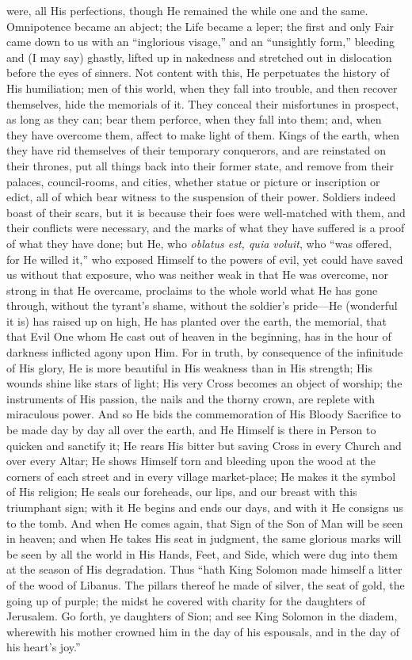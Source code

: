 were, all His perfections, though He remained the while one and the
same. Omnipotence became an abject; the Life became a leper; the first
and only Fair came down to us with an ``inglorious visage,''
and an ``unsightly form,'' bleeding and (I may say) ghastly,
lifted up in nakedness and stretched out in dislocation before the
eyes of sinners. Not content with this, He perpetuates the history of
His humiliation; men of this world, when they fall into trouble, and
then recover themselves, hide the memorials of it. They conceal their
misfortunes in prospect, as long as they can; bear them perforce, when
they fall into them; and, when they have overcome them, affect to make
light of them. Kings of the earth, when they have rid themselves of
their temporary conquerors, and are reinstated on their thrones, put
all things back into their former state, and remove from their
palaces, council-rooms, and cities, whether statue or picture or
inscription or edict, all of which bear witness to the suspension of
their power. Soldiers indeed boast of their scars, but it is because
their foes were well-matched with them, and their conflicts were
necessary, and the marks of what they have suffered is a proof of what
they have done; but He, who \emph{oblatus est, quia voluit}, who
``was offered, for He willed it,'' who exposed Himself to the
powers of evil, yet could have saved us without that exposure, who was
neither weak in that He was overcome, nor strong in that He overcame,
proclaims to the whole world what He has gone through, without the
tyrant's shame, without the soldier's pride—He (wonderful it is) has
raised up on high, He has planted over the earth, the memorial, that
that Evil One whom He cast out of heaven in the beginning, has in the
hour of darkness inflicted agony upon Him. For in truth, by
consequence of the infinitude of His glory, He is more beautiful in
His weakness than in His strength; His wounds shine like stars of
light; His very Cross becomes an object of worship; the instruments of
His passion, the nails and the thorny crown, are replete with
miraculous power. And so He bids the commemoration of His Bloody
Sacrifice to be made day by day all over the earth, and He Himself is
there in Person to quicken and sanctify it; He rears His bitter but
saving Cross in every Church and over every Altar; He shows Himself
torn and bleeding upon the wood at the corners of each street and in
every village market-place; He makes it the symbol of His religion; He
seals our foreheads, our lips, and our breast with this triumphant
sign; with it He begins and ends our days, and with it He consigns us
to the tomb. And when He comes again, that Sign of the Son of Man will
be seen in heaven; and when He takes His seat in judgment, the same
glorious marks will be seen by all the world in His Hands, Feet, and
Side, which were dug into them at the season of His degradation. Thus
``hath King Solomon made himself a litter of the wood of Libanus.
The pillars thereof he made of silver, the seat of gold, the going up
of purple; the midst he covered with charity for the daughters of
Jerusalem. Go forth, ye daughters of Sion; and see King Solomon in the
diadem, wherewith his mother crowned him in the day of his espousals,
and in the day of his heart's joy.''

